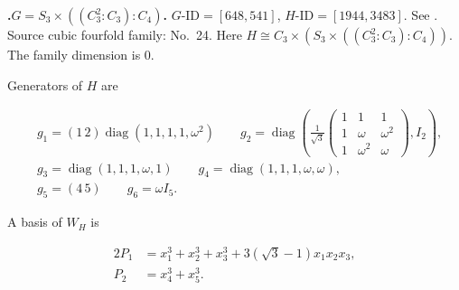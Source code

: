 \documentclass[12pt]{amsart}
\numberwithin{equation}{section}
\theoremstyle{plain}
\theoremstyle{definition}
\theoremstyle{remark}
\DeclareMathOperator{\diag}{diag}
\newenvironment{familydisplay}{%
  \begingroup
  \setlength{\arraycolsep}{1.35pt}%
  \renewcommand{\arraystretch}{0.96}%
  \setlength{\jot}{2pt}%
}{\endgroup}
\newcommand{\smat}[1]{\left(\begin{smallmatrix}#1\end{smallmatrix}\right)}
\begin{document}
\par{}\medskip\noindent\textbf{.\enspace $G=S_3\times((C_3^2:C_3):C_4)$.}\label{fam:threefold-no-5}
$G\text{-ID}=[648,541]$, $H\text{-ID}=[1944,3483]$.
See \cite[Example~3.1(2)]{LiYuThreefold}.
Source cubic fourfold family: No.~24.  Here $H\cong C_3\times(S_3\times((C_3^2:C_3):C_4))$.
The family dimension is $0$.
\par\smallskip\noindent Generators of $H$ are\par\nopagebreak
\begin{familydisplay}
\begin{align*}
&g_1=(1\,2)\diag(1,1,1,1,\omega^2)\qquad
g_2=\diag\!\left(\frac{1}{\sqrt{3}}\smat{1&1&1\\1&\omega&\omega^2\\1&\omega^2&\omega},I_2\right),\\
&g_3=\diag(1,1,1,\omega,1)\qquad g_4=\diag(1,1,1,\omega,\omega),\\
&g_5=(4\,5)\qquad g_6=\omega I_5.
\end{align*}
\end{familydisplay}
\par\smallskip\noindent A basis of $W_H$ is\par\nopagebreak
\begin{familydisplay}
\begin{alignat*}{2}
P_{1}&=x_{1}^{3}+x_{2}^{3}+x_{3}^{3}+3(\sqrt{3}-1)x_{1}x_{2}x_{3},\\[2pt]
P_{2}&=x_{4}^{3}+x_{5}^{3}.\\[2pt]
\end{alignat*}
\end{familydisplay}
\end{document}
